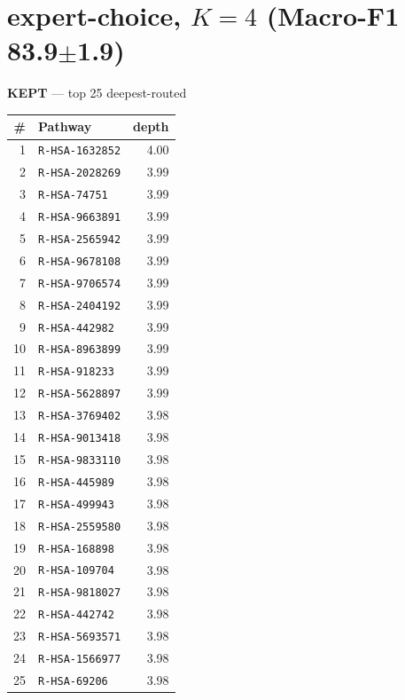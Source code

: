 \documentclass[10pt]{article}
\begin{document}
\section*{expert-choice, $K=4$  (Macro-F1 83.9$\pm$1.9)}
\filbreak
\begin{minipage}[t]{0.48\textwidth}\centering\textbf{\color{green!45!black}KEPT} --- top 25 deepest-routed\\[3pt]
\begin{tabular}{@{}r l r@{}}
\toprule
\# & Pathway & depth \\
\midrule
1 & \texttt{R-HSA-1632852} & 4.00 \\
2 & \texttt{R-HSA-2028269} & 3.99 \\
3 & \texttt{R-HSA-74751} & 3.99 \\
4 & \texttt{R-HSA-9663891} & 3.99 \\
5 & \texttt{R-HSA-2565942} & 3.99 \\
6 & \texttt{R-HSA-9678108} & 3.99 \\
7 & \texttt{R-HSA-9706574} & 3.99 \\
8 & \texttt{R-HSA-2404192} & 3.99 \\
9 & \texttt{R-HSA-442982} & 3.99 \\
10 & \texttt{R-HSA-8963899} & 3.99 \\
11 & \texttt{R-HSA-918233} & 3.99 \\
12 & \texttt{R-HSA-5628897} & 3.99 \\
13 & \texttt{R-HSA-3769402} & 3.98 \\
14 & \texttt{R-HSA-9013418} & 3.98 \\
15 & \texttt{R-HSA-9833110} & 3.98 \\
16 & \texttt{R-HSA-445989} & 3.98 \\
17 & \texttt{R-HSA-499943} & 3.98 \\
18 & \texttt{R-HSA-2559580} & 3.98 \\
19 & \texttt{R-HSA-168898} & 3.98 \\
20 & \texttt{R-HSA-109704} & 3.98 \\
21 & \texttt{R-HSA-9818027} & 3.98 \\
22 & \texttt{R-HSA-442742} & 3.98 \\
23 & \texttt{R-HSA-5693571} & 3.98 \\
24 & \texttt{R-HSA-1566977} & 3.98 \\
25 & \texttt{R-HSA-69206} & 3.98 \\
\bottomrule
\end{tabular}
\end{minipage}\hfill
\end{document}
